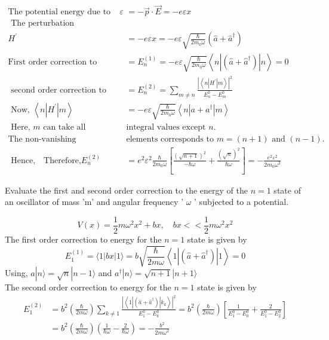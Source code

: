 \begin{answer}
	\begin{align*}
	\text{The potential energy due to the field $\varepsilon$}&\text{$=-\vec{p} \cdot \vec{E}=-e \varepsilon x$}\\
\text{	The perturbation }&\\
H^{\prime}&=-e \varepsilon x=-e \varepsilon \sqrt{\frac{\hbar}{2 m_{0} \omega}}\left(\hat{a}+\hat{a}^{\dagger}\right)\\
	\text{First order correction to energy}
	&=E_{n}^{(1)}=-e \varepsilon \sqrt{\frac{\hbar}{2 m_{0} \omega}}\left\langle n\left|\left(\hat{a}+\hat{a}^{\dagger}\right)\right| n\right\rangle=0\\
	\text { second order correction to energy }&=E_{n}^{(2)}=\sum_{m \neq n} \frac{\left|\left\langle n\left|H^{\prime}\right| m\right\rangle\right|^{2}}{E_{n}^{0}-E_{m}^{0}}\\
	\text { Now, }\left\langle n\left|H^{\prime}\right| m\right\rangle&=-e \varepsilon \sqrt{\frac{\hbar}{2 m_{0} \omega}}\left\langle n\left|a+a^{\dagger}\right| m\right\rangle\\
\text{	Here, $m$ can take all }&\text{integral values except $n$.}\\
	\text{The non-vanishing }&\text{elements corresponds to $m=(n+1)$ and $(n-1)$.}\\
\text{	Hence,$\quad$
	Therefore,} E_{n}^{(2)}&=e^{2} \varepsilon^{2} \frac{\hbar}{2 m_{0} \omega}\left[\frac{(\sqrt{n+1})^{2}}{-\hbar \omega}+\frac{(\sqrt{n})^{2}}{\hbar \omega}\right]=-\frac{e^{2} \varepsilon^{2}}{2 m_{0} \omega^{2}}
	\end{align*}
\end{answer}
\begin{exercise}
	 Evaluate the first and second order correction to the energy of the $n=1$ state of an oscillator of mass 'm' and angular frequency ' $\omega$ ' subjected to a potential.
\end{exercise}
\begin{answer}
	$$
	V(x)=\frac{1}{2} m \omega^{2} x^{2}+b x, \quad b x<<\frac{1}{2} m \omega^{2} x^{2}
	$$
	The first order correction to energy for the $n=1$ state is given by
	$$
	E_{1}^{(1)}=\langle 1|b x| 1\rangle=b \sqrt{\frac{\hbar}{2 m \omega}}\left\langle 1\left|\left(\hat{a}+\hat{a}^{\dagger}\right)\right| 1\right\rangle=0
	$$
	Using, $a|n\rangle=\sqrt{n}|n-1\rangle$ and $a^{\dagger}|n\rangle=\sqrt{n+1}|n+1\rangle$\\
	The second order correction to energy for the $n=1$ state is given by
	$$
	\begin{aligned}
	E_{1}^{(2)} &=b^{2}\left(\frac{\hbar}{2 m \omega}\right) \sum_{k \neq 1} \frac{\left|\left\langle 1\left|\left(\hat{a}+\hat{a}^{\dagger}\right)\right| k_{k}\right\rangle\right|^{2}}{E_{1}^{0}-E_{k}^{0}}=b^{2}\left(\frac{\hbar}{2 m \omega}\right)\left[\frac{1}{E_{1}^{0}-E_{0}^{0}}+\frac{2}{E_{1}^{0}-E_{2}^{0}}\right] \\
	&=b^{2}\left(\frac{\hbar}{2 m \omega}\right)\left(\frac{1}{\hbar \omega}-\frac{2}{\hbar \omega}\right)=-\frac{b^{2}}{2 m \omega^{2}}
	\end{aligned}
	$$
\end{answer}
